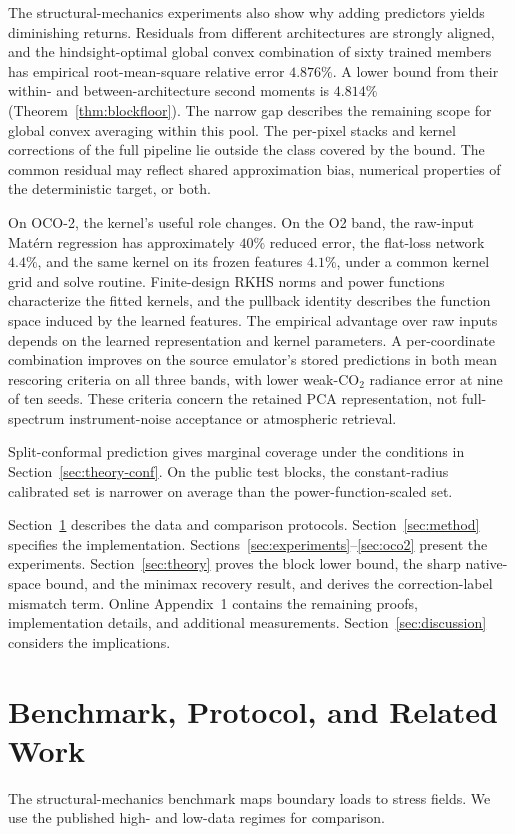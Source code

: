\documentclass[twoside,11pt]{article}
\newcommand{\saSixtyOracleRms}{4.876}
\newcommand{\saBound}{4.814}         %
\begin{document}
The structural-mechanics experiments also show why adding predictors yields diminishing returns. Residuals from different architectures are strongly aligned, and the hindsight-optimal global convex combination of sixty trained members has empirical root-mean-square relative error $\saSixtyOracleRms\%$. A lower bound from their within- and between-architecture second moments is $\saBound\%$ (Theorem~\ref{thm:blockfloor}). The narrow gap describes the remaining scope for global convex averaging within this pool. The per-pixel stacks and kernel corrections of the full pipeline lie outside the class covered by the bound. The common residual may reflect shared approximation bias, numerical properties of the deterministic target, or both.

On OCO-2, the kernel's useful role changes. On the O2 band, the raw-input Mat\'ern regression has approximately $40\%$ reduced error, the flat-loss network $4.4\%$, and the same kernel on its frozen features $4.1\%$, under a common kernel grid and solve routine. Finite-design RKHS norms and power functions characterize the fitted kernels, and the pullback identity describes the function space induced by the learned features. The empirical advantage over raw inputs depends on the learned representation and kernel parameters. A per-coordinate combination improves on the source emulator's stored predictions in both mean rescoring criteria on all three bands, with lower weak-CO$_2$ radiance error at nine of ten seeds. These criteria concern the retained PCA representation, not full-spectrum instrument-noise acceptance or atmospheric retrieval.

Split-conformal prediction gives marginal coverage under the conditions in Section~\ref{sec:theory-conf}. On the public test blocks, the constant-radius calibrated set is narrower on average than the power-function-scaled set.

Section~\ref{sec:benchmark} describes the data and comparison protocols. Section~\ref{sec:method} specifies the implementation. Sections~\ref{sec:experiments}--\ref{sec:oco2} present the experiments. Section~\ref{sec:theory} proves the block lower bound, the sharp native-space bound, and the minimax recovery result, and derives the correction-label mismatch term. Online Appendix~1 contains the remaining proofs, implementation details, and additional measurements. Section~\ref{sec:discussion} considers the implications.


\section{Benchmark, Protocol, and Related Work}
\label{sec:benchmark}
The structural-mechanics benchmark maps boundary loads to stress fields. We use the published high- and low-data regimes for comparison.
\end{document}
